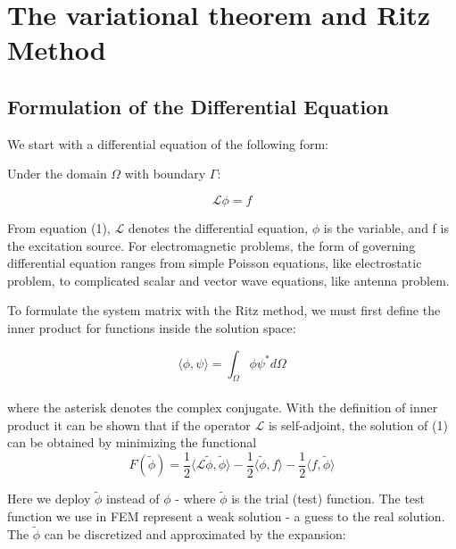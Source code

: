 \documentclass[journal]{IEEEtran}
\begin{document}
 



\section{The variational theorem and Ritz Method}

\subsection{Formulation of the Differential Equation}
We start with a differential equation of the following form:

Under the domain $\Omega$ with boundary $\Gamma$:

\begin{equation}
\mathcal{L} \phi = f
\end{equation}

From equation (1), $\mathcal{L}$ denotes the differential equation, $\phi$ is the variable, and f is the excitation source. For electromagnetic problems, the form of governing differential equation ranges from simple Poisson equations, like electrostatic problem, to complicated scalar and vector wave equations, like antenna problem. 

To formulate the system matrix with the Ritz method, we must first define the inner product for functions inside the solution space:

\begin{equation}
\langle \phi, \psi \rangle = \int_{\Omega}\phi \psi^* d\Omega
\end{equation}
\\where the asterisk denotes the complex conjugate. With the definition of inner product it can be shown that if the operator  $\mathcal{L}$ is self-adjoint, the solution of (1) can be obtained by minimizing the functional 
\begin{equation}
F(\widetilde{\phi}) = \frac{1}{2} \langle \mathcal{L}\widetilde{\phi}, \widetilde{\phi} \rangle - \frac{1}{2} \langle \widetilde{\phi}, f \rangle - \frac{1}{2} \langle f,\widetilde{\phi} \rangle
\end{equation}

Here we deploy $\widetilde{\phi}$ instead of $\phi$ - where $\widetilde{\phi}$ is the trial (test) function. The test function we use in FEM represent a weak solution - a guess to the real solution. The $\widetilde{\phi}$ can be discretized and approximated by the expansion:
\end{document}
